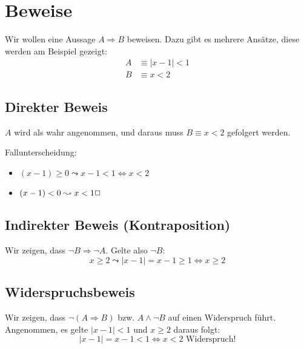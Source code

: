 \chapter{Beweise}
Wir wollen eine Aussage $A\Rightarrow B$ beweisen. Dazu gibt es mehrere Ansätze, diese werden am Beispiel gezeigt:
\begin{align*}
  A &\equiv |x-1|<1\\
  B &\equiv x<2
\end{align*}
\section{Direkter Beweis}
$A$ wird als wahr angenommen, und daraus muss $B\equiv x<2$ gefolgert werden.

Fallunterscheidung:
\begin{itemize}
  \item $(x-1)\geq0\leadsto x-1<1 \Leftrightarrow x<2$
  \item $(x-1)<0\leadsto x<1 \hfill\Box$
\end{itemize}
\section{Indirekter Beweis (Kontraposition)}
Wir zeigen, dass $\neg B\Rightarrow \neg A$.
Gelte also $\neg B$:
\begin{equation*}
  x\geq2 \leadsto |x-1|=x-1\geq 1 \Leftrightarrow x\geq 2
\end{equation*}
\section{Widerspruchsbeweis}
Wir zeigen, dass $\neg(A\Rightarrow B)$ bzw. $A\wedge \neg B$ auf einen Widerspruch führt.
Angenommen, es gelte $|x-1|<1$ und $x\geq 2$ daraus folgt:
\begin{equation*}
  |x-1|=x-1<1\Leftrightarrow x<2 \text{ Widerspruch!}
\end{equation*}
